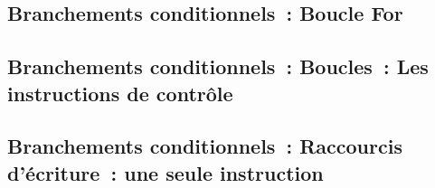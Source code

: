 

\subsection*{Branchements conditionnels~: Boucle For}















\subsection*{Branchements conditionnels~: Boucles~: Les instructions de contrôle}





\subsection*{Branchements conditionnels~: Raccourcis d'écriture~: une seule instruction}


